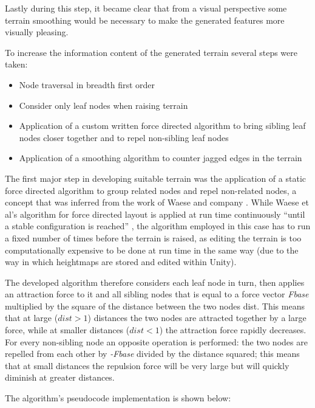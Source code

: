 \documentclass[10pt,letterpaper]{article}
\begin{document}
Lastly during this step, it became clear that from a visual perspective some terrain smoothing would be necessary to make the generated features more visually pleasing.

To increase the information content of the generated terrain several steps were taken:

\begin{itemize}
	\item Node traversal in breadth first order
	\item Consider only leaf nodes when raising terrain
	\item Application of a custom written force directed algorithm to bring sibling leaf nodes closer together and to repel non-sibling leaf nodes
	\item Application of a smoothing algorithm to counter jagged edges in the terrain
\end{itemize}


The first major step in developing suitable terrain was the application of a static force directed algorithm to group related nodes and repel non-related nodes, a concept that was inferred from the work of Waese and company \cite{bib3}. While Waese et al’s algorithm for force directed layout is applied at run time continuously “until a stable configuration is reached” \cite{bib3}, the algorithm employed in this case has to run a fixed number of times before the terrain is raised, as editing the terrain is too computationally expensive to be done at run time in the same way (due to the way in which heightmaps are stored and edited within Unity).

The developed algorithm therefore considers each leaf node in turn, then applies an attraction force to it and all sibling nodes that is equal to a force vector \textit{Fbase} multiplied by the square of the distance between the two nodes dist. This means that at large ($dist > 1$) distances the two nodes are attracted together by a large force, while at smaller distances ($dist < 1$) the attraction force rapidly decreases. For every non-sibling node an opposite operation is performed: the two nodes are repelled from each other by \textit{-Fbase} divided by the distance squared; this means that at small distances the repulsion force will be very large but will quickly diminish at greater distances.

The algorithm’s pseudocode implementation is shown below: 
\end{document}
